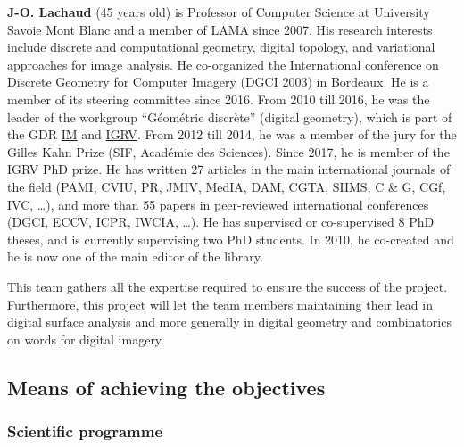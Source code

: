 \textbf{J-O. Lachaud} (45 years old) is Professor of Computer Science
at University Savoie Mont Blanc and a member of LAMA since 2007. His
research interests include discrete and computational geometry,
digital topology, and variational approaches for image analysis. He
co-organized the International conference on Discrete Geometry for
Computer Imagery (DGCI 2003) in Bordeaux. He is a member of its
steering committee since 2016. From 2010 till 2016, he was the leader
of the workgroup ``Géométrie discrète'' (digital geometry), which is
part of the GDR \href{http://www.gdr-im.fr}{IM} and
\href{http://icube-web.unistra.fr/gdr-igrv}{IGRV}. From 2012 till
2014, he was a member of the jury for the Gilles Kahn Prize (SIF,
Académie des Sciences). Since 2017, he is member of the IGRV PhD
prize. He has written 27 articles in the main international journals
of the field (PAMI, CVIU, PR, JMIV, MedIA, DAM, CGTA, SIIMS, C \& G,
CGf, IVC, \ldots), and more than 55 papers in peer-reviewed
international conferences (DGCI, ECCV, ICPR, IWCIA, \ldots). He has
supervised or co-supervised 8 PhD theses, and is currently supervising
two PhD students. In 2010, he co-created {\DGtal} and he is now one of
the main editor of the library. \smallskip




This team gathers all the expertise required to ensure the success of the project.
Furthermore, this project will let the team members maintaining their lead in digital surface analysis 
and more generally in digital geometry and combinatorics on words for digital imagery. 


\subsection{Means of achieving the objectives}


\subsubsection{Scientific programme}
\label{sec:wp}


